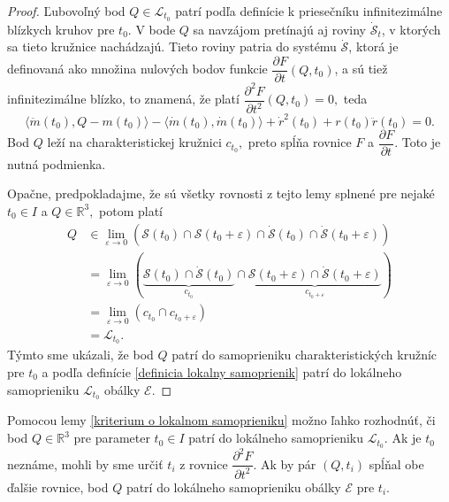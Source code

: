 \begin{proof}
Ľubovoľný bod $Q \in \mathcal{L}_{t_0}$ patrí podľa definície k priesečníku infinitezimálne blízkych kruhov pre $t_0$. V bode $Q$ sa navzájom pretínajú aj roviny $\mathcal{\dot{S}}_t$, v ktorých sa tieto kružnice nachádzajú. Tieto roviny patria do systému $\mathcal{\dot{S}}$, ktorá je definovaná ako množina nulových bodov funkcie $\dfrac{\partial F}{\partial t}(Q, t_0)$, a sú tiež infinitezimálne blízko, to znamená, že platí $\dfrac{\partial^2 F}{\partial t^2}(Q,t_0) = 0, $ teda
\begin{equation}
\label{eq:druha derivacia}
\langle \ddot{m}(t_0), Q-m(t_0) \rangle - \langle \dot{m}(t_0), \dot{m}(t_0) \rangle + \dot{r}^2(t_0) + r(t_0)\ddot{r}(t_0) = 0. 
\end{equation}
Bod $Q$ leží na charakteristickej kružnici $c_{t_0},$ preto spĺňa rovnice $F $ a $\dfrac{\partial F}{\partial t}.$ Toto je nutná podmienka.

Opačne, predpokladajme, že sú všetky rovnosti z tejto lemy splnené pre nejaké $t_0 \in I$ a $Q \in \mathbb{R}^3, $ potom platí
\begin{align*}
Q &\in \lim_{\varepsilon \to 0} \left( \mathcal{S}(t_0) \cap \mathcal{S}(t_0 + \varepsilon) \cap  \mathcal{\dot{S}}(t_0) \cap  \mathcal{\dot{S}}(t_0 + \varepsilon) \right) \\
&= \lim_{\varepsilon \to 0} \left( \underbrace{\mathcal{S}(t_0) \cap \mathcal{\dot{S}}(t_0)}_{c_{t_0}} \cap \underbrace{\mathcal{S}(t_0 + \varepsilon) \cap \mathcal{\dot{S}}(t_0 + \varepsilon)}_{c_{t_0 + \varepsilon}} \right) \\
&= \lim_{\varepsilon \to 0} \left( {c_{t_0}} \cap {c_{t_0 + \varepsilon}} \right) \\
&= \mathcal{L}_{t_0}.
\end{align*}
Týmto sme ukázali, že bod $Q$ patrí do samoprieniku charakteristických kružníc pre $t_0$ a podľa definície \ref{definicia lokalny samoprienik} patrí do lokálneho samoprieniku $\mathcal{L}_{t_0}$ obálky $\mathcal{E}$.
\end{proof}

Pomocou lemy \ref{kriterium o lokalnom samoprieniku} možno ľahko rozhodnúť, či bod $Q \in \mathbb{R}^3$ pre parameter $t_0 \in I$ patrí do lokálneho samoprieniku $\mathcal{L}_{t_0}.$ Ak je $t_0$ neznáme, mohli by sme určiť $t_i$ z rovnice $\dfrac{\partial^2 F}{\partial t^2}$. Ak by pár $(Q, t_i)$ spĺňal obe ďalšie rovnice, bod $Q$ patrí do lokálneho samoprieniku obálky $\mathcal{E}$ pre $t_i.$

